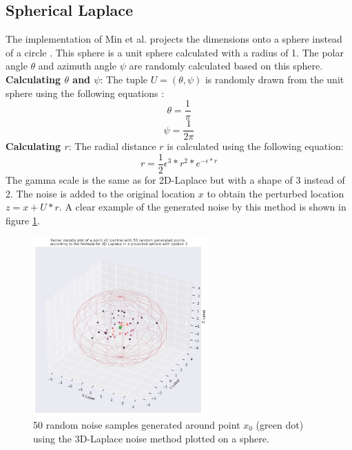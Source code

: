\subsection{Spherical Laplace}
The implementation of Min et al. projects the dimensions onto a sphere instead of a circle \citep{9646489}.
This sphere is a unit sphere calculated with a radius of 1.
The polar angle $\theta$ and azimuth angle $\psi$ are randomly calculated based on this sphere. \newline
{}
\textbf{Calculating $\theta$ and $\psi$}: The tuple $U = (\theta, \psi)$ is randomly drawn from the unit sphere using the following equations \citep{9646489}:
\begin{equation}
  \theta = \frac{1}{\pi}
\end{equation}
\begin{equation}
  \psi = \frac{1}{2\pi}
\end{equation}
\textbf{Calculating $r$}: The radial distance $r$ is calculated using the following equation:
\begin{equation}
  r = \frac{1}{2}\epsilon^3 * r^2 * e^{-\epsilon * r}
  \label{eq:3d-laplace-r}
\end{equation}
The gamma scale is the same as for 2D-Laplace but with a shape of 3 instead of 2.
The noise is added to the original location $x$ to obtain the perturbed location $z = x + U*r$.
A clear example of the generated noise by this method is shown in figure \ref{fig:3d-laplace-noise}.
\begin{figure}
  \includegraphics[width=0.6\textwidth]{TheorethicalFramework/ND-Laplace/Images/3d_laplace_noise.png}
  \caption{50 random noise samples generated around point $x_0$ (green dot) using the 3D-Laplace noise method \citep{9646489} plotted on a sphere.}
  \label{fig:3d-laplace-noise}
\end{figure}
